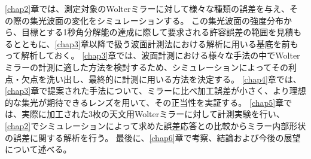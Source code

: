 \ref{chap2}章では、測定対象のWolterミラーに対して様々な種類の誤差を与え、その際の集光波面の変化をシミュレーションする。
この集光波面の強度分布から、目標とする1秒角分解能の達成に際して要求される許容誤差の範囲を見積もるとともに、\ref{chap3}章以降で扱う波面計測法における解析に用いる基底を前もって解析しておく。
\ref{chap3}章では、波面計測における様々な手法の中でWolterミラーの計測に適した方法を検討するため、シミュレーションによってその利点・欠点を洗い出し、最終的に計測に用いる方法を決定する。
\ref{chap4}章では、\ref{chap3}章で提案された手法について、ミラーに比べ加工誤差が小さく、より理想的な集光が期待できるレンズを用いて、その正当性を実証する。
\ref{chap5}章では、実際に加工された3枚の天文用Wolterミラーに対して計測実験を行い、\ref{chap2}でシミュレーションによって求めた誤差応答との比較からミラー内部形状の誤差に関する解析を行う。
最後に、\ref{chap6}章で考察、結論および今後の展望について述べる。

